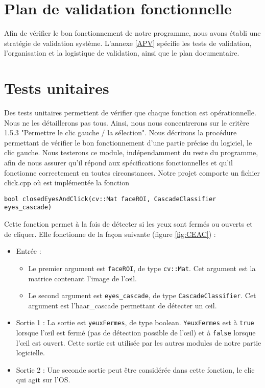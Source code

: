 \section{Plan de validation fonctionnelle}

Afin de vérifier le bon fonctionnement de notre programme, nous avons établi une stratégie de validation système. L'annexe \ref{APV} spécifie les tests de validation, l'organisation et la logistique de validation, ainsi que le plan documentaire. 

\section{Tests unitaires}

Des tests unitaires permettent de vérifier que chaque fonction est opérationnelle. Nous ne les détaillerons pas tous. Ainsi, nous nous concentrerons sur le critère 1.5.3 "Permettre le clic gauche / la sélection". Nous décrirons la procédure permettant de vérifier le bon fonctionnement d’une partie précise du logiciel, le clic gauche. Nous testerons ce module, indépendamment du reste du programme, afin de nous assurer qu’il répond aux spécifications fonctionnelles et qu’il fonctionne correctement en toutes circonstances.
Notre projet comporte un fichier click.cpp où est implémentée la fonction
\begin{lstlisting}
bool closedEyesAndClick(cv::Mat faceROI, CascadeClassifier eyes_cascade)
\end{lstlisting}

Cette fonction permet à la fois de détecter si les yeux sont fermés ou ouverts et de cliquer. Elle fonctionne de la façon suivante (figure \ref{fig:CEAC}) :
\begin{itemize}[font=\tiny, label=]
\item Entrée :
\begin{itemize}[font=\tiny, label=]
\item Le premier argument est \lstinline=faceROI=, de type \lstinline=cv::Mat=. Cet argument est la matrice contenant l’image de l’œil.
\item Le second argument est \lstinline=eyes_cascade=, de type \lstinline=CascadeClassifier=. Cet argument est l’haar\_cascade permettant de détecter un œil.
\end{itemize}
\item  Sortie 1 : La sortie est \lstinline=yeuxFermes=, de type boolean. \lstinline=YeuxFermes= est à \lstinline=true= lorsque l’œil est fermé (pas de détection possible de l’œil) et à \lstinline=false= lorsque l’œil est ouvert. Cette sortie est utilisée par les autres modules de notre partie logicielle.
\item Sortie 2 : Une seconde sortie peut être considérée dans cette fonction, le clic qui agit sur l’OS.
\end{itemize}

